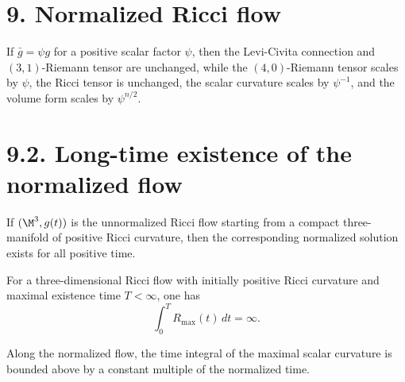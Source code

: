 \section*{9. Normalized Ricci flow}

\begin{lemma}
\label{ch06-lem-scaling-relations}

If \(\bar g=\psi g\) for a positive scalar factor \(\psi\), then the Levi-Civita connection and \((3,1)\)-Riemann tensor are unchanged, while the \((4,0)\)-Riemann tensor scales by \(\psi\), the Ricci tensor is unchanged, the scalar curvature scales by \(\psi^{-1}\), and the volume form scales by \(\psi^{n/2}\).
\end{lemma}

\section*{9.2. Long-time existence of the normalized flow}

\begin{theorem}
\label{ch06-thm-long-time-existence-normalized-flow}

If \((\M^3,g(t))\) is the unnormalized Ricci flow starting from a compact three-manifold of positive Ricci curvature, then the corresponding normalized solution exists for all positive time.
\end{theorem}

\begin{lemma}
\label{ch06-lem-blowup-max-scalar-integral}

For a three-dimensional Ricci flow with initially positive Ricci curvature and maximal existence time \(T<\infty\), one has
\[
\int_0^T R_{\max}(t)\,dt=\infty.
\]
\end{lemma}

\begin{lemma}
\label{ch06-lem-uniform-upper-bound-normalized-max-scalar}

Along the normalized flow, the time integral of the maximal scalar curvature is bounded above by a constant multiple of the normalized time.
\end{lemma}

